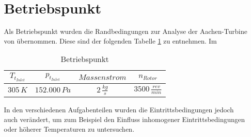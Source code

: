 \section{Betriebspunkt}
\label{subsec:aachensetup}
Als Betriebspunkt wurden die Randbedingungen zur Analyse der Aachen-Turbine von 
\cite{ufi2001YaoDavis}
übernommen. Diese sind der folgenden Tabelle \ref{tab:aachensetup} zu entnehmen. Im 
\begin{table}[H]
\centering
\label{tab:aachensetup}
\caption{Betriebspunkt}
\begin{tabular}{ c| c| c| c}
$T_{t_{Inlet}}$&$p_{t_{Inlet}}$&$Massenstrom$&$n_{Rotor}$\\
\hline
$305 \, K$&$152.000 \, Pa$&$2 \, \frac{kg}{s}$&$3500 \, \frac{rev}{min}$\\
\end{tabular}
\end{table}
In den verschiedenen Aufgabenteilen wurden die Eintrittsbedingungen jedoch auch verändert, um zum Beispiel den Einfluss inhomogener Eintrittsbedingungen oder höherer Temperaturen zu untersuchen.






